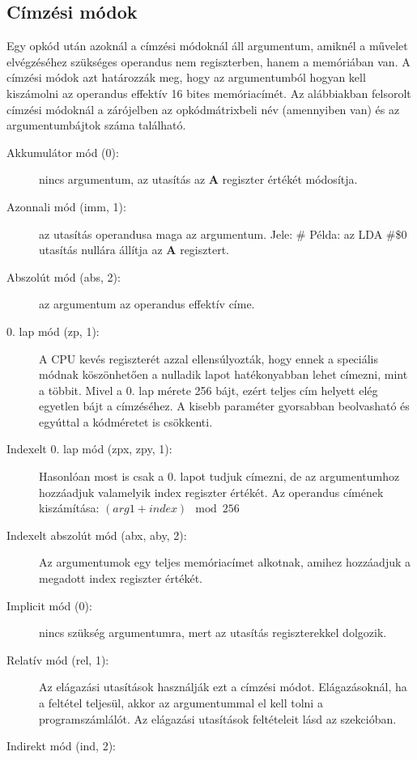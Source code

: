 \subsection{Címzési módok}

Egy opkód után azoknál a címzési módoknál áll argumentum, amiknél a művelet elvégzéséhez 
szükséges operandus nem regiszterben, hanem a memóriában van. A címzési módok \cite{6502desc, cpuref} azt határozzák meg, hogy az argumentumból hogyan kell kiszámolni az operandus effektív 16 bites memóriacímét. Az alábbiakban felsorolt  címzési módoknál a zárójelben az opkódmátrixbeli név (amennyiben van) és az argumentumbájtok száma található.  


\begin{description}
	\item[Akkumulátor mód (0):] nincs argumentum, az utasítás az \textbf{A} regiszter értékét módosítja.
	\item[Azonnali mód (imm, 1):] az utasítás operandusa maga az argumentum. Jele: \#
	\newline
	Példa: az LDA \#\$0 utasítás nullára állítja az \textbf{A} regisztert.
	\item[Abszolút mód (abs, 2):] az argumentum az operandus effektív címe.
	\item[0. lap mód (zp, 1):] A CPU kevés regiszterét azzal ellensúlyozták, hogy ennek a speciális módnak köszönhetően a nulladik lapot hatékonyabban lehet címezni, mint a többit. 
	Mivel a 0. lap mérete 256 bájt, ezért teljes cím helyett elég egyetlen bájt a címzéséhez.
	A kisebb paraméter gyorsabban beolvasható és egyúttal a kódméretet is csökkenti.
	\item[Indexelt 0. lap mód (zpx, zpy, 1):]
	Hasonlóan most is csak a 0. lapot tudjuk címezni, de az argumentumhoz hozzáadjuk valamelyik index regiszter értékét.
	Az operandus címének kiszámítása: $ (arg1 + index) \mod 256 $
	\item[Indexelt abszolút mód (abx, aby, 2):] Az argumentumok egy teljes memóriacímet alkotnak, amihez hozzáadjuk a megadott index regiszter értékét. 
	\item[Implicit mód (0):] nincs szükség argumentumra, mert az utasítás regiszterekkel dolgozik.
	\item[Relatív mód (rel, 1):] Az elágazási utasítások használják ezt a címzési módot. Elágazásoknál, ha a feltétel teljesül, akkor az argumentummal el kell tolni a programszámlálót. Az elágazási utasítások feltételeit lásd az \emph{} szekcióban.
	\item[Indirekt mód (ind, 2):] 

\end{description}
